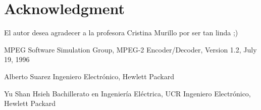 \documentclass[journal]{IEEEtran}
\begin{document}
\section*{Acknowledgment}


El autor desea agradecer a la profesora Cristina Murillo por ser tan linda ;)

\begin{thebibliography}{1}

MPEG Software Simulation Group, MPEG-2 Encoder/Decoder, Version 1.2, July 19, 1996
\end{thebibliography}

\begin{IEEEbiographynophoto}{Alberto Suarez}
Ingeniero Electr\'{o}nico, Hewlett Packard
\end{IEEEbiographynophoto}

\begin{IEEEbiographynophoto}{Yu Shan Hsieh}
Bachillerato en Ingenier\'{i}a El\'{e}ctrica, UCR
Ingeniero Electr\'{o}nico, Hewlett Packard
\end{IEEEbiographynophoto}
\end{document}
